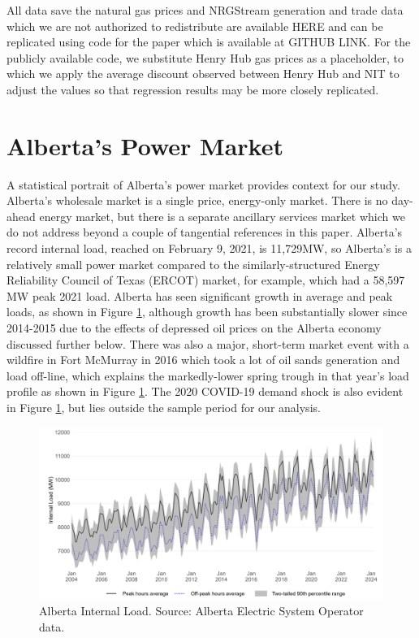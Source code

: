 \documentclass[12pt]{article}
\begin{document}
All data save the natural gas prices and NRGStream generation and trade data which we are not authorized to redistribute are available HERE and can be replicated using code for the paper which is available at GITHUB LINK. For the publicly available code, we substitute Henry Hub gas prices as a placeholder, to which we apply the average discount observed between Henry Hub and NIT to adjust the values so that regression results may be more closely replicated.

\section{Alberta's Power Market}

A statistical portrait of Alberta's power market provides context for our study. Alberta's wholesale market is a single price, energy-only market. There is no day-ahead energy market, but there is a separate ancillary services market which we do not address beyond a couple of tangential references in this paper.  Alberta's record internal load, reached on February 9, 2021, is 11,729MW, so Alberta's is a relatively small power market compared to the similarly-structured Energy Reliability Council of Texas (ERCOT) market, for example, which had a 58,597 MW peak 2021 load. Alberta has seen significant growth in average and peak loads, as shown in Figure \ref{fig:ab_load}, although growth has been substantially slower since 2014-2015 due to the effects of depressed oil prices on the Alberta economy discussed further below. There was also a major, short-term market event with a wildfire in Fort McMurray in 2016 which took a lot of oil sands generation and load off-line, which explains the markedly-lower spring trough in that year's load profile as shown in Figure \ref{fig:ab_load}. The 2020 COVID-19 demand shock is also evident in Figure \ref{fig:ab_load}, but lies outside the sample period for our analysis.

\begin{figure}[t]%
	\centering \vspace{-.25cm} \includegraphics[width=6.5in]{../images/loads_clean.png}
\vspace{-0.75cm}	\caption{Alberta Internal Load. Source: Alberta Electric System Operator data.}
\label{fig:ab_load}
\end{figure}
\end{document}
